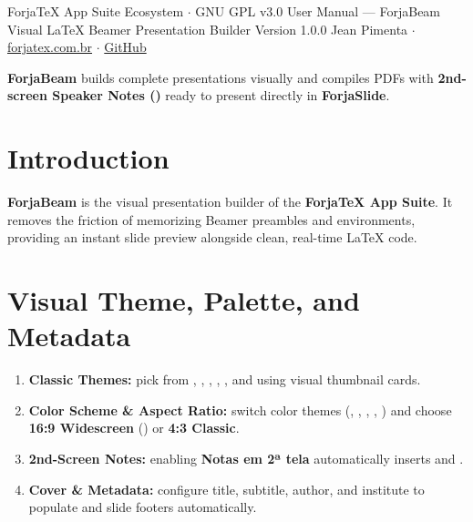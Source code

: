 \documentclass[11pt,a4paper]{article}
\begin{document}
  {ForjaTeX App Suite Ecosystem $\cdot$ GNU GPL v3.0}
  {User Manual --- ForjaBeam}
  {Visual \LaTeX{} Beamer Presentation Builder}
  {Version 1.0.0}
  {Jean Pimenta $\cdot$ \href{https://forjatex.com.br}{\color{fjsky}forjatex.com.br} $\cdot$ \href{https://github.com/jeanjpimenta/forjatex-suite}{\color{fjsky}GitHub}}


\begin{fjcallout}
\textbf{ForjaBeam} builds complete  presentations visually and compiles PDFs with \textbf{2nd-screen Speaker Notes ()} ready to present directly in \textbf{ForjaSlide}.
\end{fjcallout}

\section{Introduction}
\textbf{ForjaBeam} is the visual presentation builder of the \textbf{ForjaTeX App Suite}. It removes the friction of memorizing Beamer preambles and environments, providing an instant slide preview alongside clean, real-time \LaTeX{} code.

\section{Visual Theme, Palette, and Metadata}
\begin{enumerate}
  \item \textbf{Classic Themes:} pick from , , , , , and  using visual thumbnail cards.
  \item \textbf{Color Scheme \& Aspect Ratio:} switch color themes (, , , , ) and choose \textbf{16:9 Widescreen} () or \textbf{4:3 Classic}.
  \item \textbf{2nd-Screen Notes:} enabling \textbf{Notas em 2ª tela} automatically inserts  and .
  \item \textbf{Cover \& Metadata:} configure title, subtitle, author, and institute to populate  and slide footers automatically.
\end{enumerate}
\end{document}
